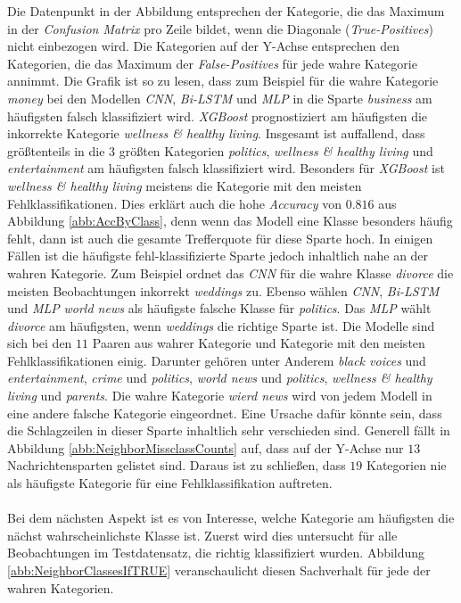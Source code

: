 \documentclass[a4paper,11pt]{article}
\begin{document}
Die Datenpunkt in der Abbildung entsprechen der Kategorie, die das Maximum in der \textit{Confusion Matrix} pro Zeile bildet, wenn die Diagonale (\textit{True-Positives}) nicht einbezogen wird. Die Kategorien auf der Y-Achse entsprechen den Kategorien, die das Maximum der \textit{False-Positives} für jede wahre Kategorie annimmt. Die Grafik ist so zu lesen, dass zum Beispiel für die wahre Kategorie \textit{money} bei den Modellen \textit{CNN}, \textit{Bi-LSTM} und \textit{MLP} in die Sparte \textit{business} am häufigsten falsch klassifiziert wird. \textit{XGBoost} prognostiziert am häufigsten die inkorrekte Kategorie \textit{wellness \& healthy living}. Insgesamt ist auffallend, dass größtenteils in die $3$ größten Kategorien \textit{politics}, \textit{wellness \& healthy living} und \textit{entertainment} am häufigsten falsch klassifiziert wird. Besonders für \textit{XGBoost} ist \textit{wellness \& healthy living} meistens die Kategorie mit den meisten Fehlklassifikationen. Dies erklärt auch die hohe \textit{Accuracy} von $0.816$ aus Abbildung \ref{abb:AccByClass}, denn wenn das Modell eine Klasse besonders häufig fehlt, dann ist auch die gesamte Trefferquote für diese Sparte hoch. In einigen Fällen ist die häufigste fehl-klassifizierte Sparte jedoch inhaltlich nahe an der wahren Kategorie. Zum Beispiel ordnet das \textit{CNN} für die wahre Klasse \textit{divorce} die meisten Beobachtungen inkorrekt \textit{weddings} zu. Ebenso wählen \textit{CNN}, \textit{Bi-LSTM} und \textit{MLP} \textit{world news} als häufigste falsche Klasse für \textit{politics}. Das \textit{MLP} wählt \textit{divorce} am häufigsten, wenn \textit{weddings} die richtige Sparte ist. Die Modelle sind sich bei den $11$ Paaren aus wahrer Kategorie und Kategorie mit den meisten Fehlklassifikationen einig. Darunter gehören unter Anderem \textit{black voices} und \textit{entertainment}, \textit{crime} und \textit{politics}, \textit{world news} und \textit{politics}, \textit{wellness \& healthy living} und \textit{parents}. Die wahre Kategorie \textit{wierd news} wird von jedem Modell in eine andere falsche Kategorie eingeordnet. Eine Ursache dafür könnte sein, dass die Schlagzeilen in dieser Sparte inhaltlich sehr verschieden sind. Generell fällt in Abbildung \ref{abb:NeighborMissclassCounts} auf, dass auf der Y-Achse nur $13$ Nachrichtensparten gelistet sind. Daraus ist zu schließen, dass $19$ Kategorien nie als häufigste Kategorie für eine Fehlklassifikation auftreten.\\
\\
Bei dem nächsten Aspekt ist es von Interesse, welche Kategorie am häufigsten die nächst wahrscheinlichste Klasse ist. Zuerst wird dies untersucht für alle Beobachtungen im Testdatensatz, die richtig klassifiziert wurden. Abbildung \ref{abb:NeighborClassesIfTRUE} veranschaulicht diesen Sachverhalt für jede der wahren Kategorien.
\end{document}
